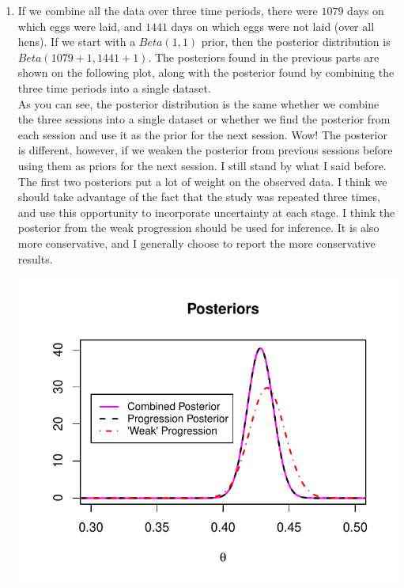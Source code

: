 \documentclass[11pt]{article}\usepackage[]{graphicx}\usepackage[]{color}
\newenvironment{knitrout}{}{} %
\begin{document}
\begin{doublespacing}
\begin{enumerate}
\begin{enumerate}
\begin{center}
\begin{knitrout}
\end{knitrout}
\end{center}

\item If we combine all the data over three time periods, there were $1079$ days on which eggs were laid, and $1441$ days on which eggs were not laid (over all hens). If we start with a $Beta(1, 1)$ prior, then the posterior distribution is $Beta(1079+1, 1441+1)$. The posteriors found in the previous parts are shown on the following plot, along with the posterior found by combining the three time periods into a single dataset. \\

As you can see, the posterior distribution is the same whether we combine the three sessions into a single dataset or whether we find the posterior from each session and use it as the prior for the next session. Wow! The posterior is different, however, if we weaken the posterior from previous sessions before using them as priors for the next session. I still stand by what I said before. The first two posteriors put a lot of weight on the observed data. I think we should take advantage of the fact that the study was repeated three times, and use this opportunity to incorporate uncertainty at each stage. I think the posterior from the weak progression should be used for inference. It is also more conservative, and I generally choose to report the more conservative results.

\begin{center}
\begin{knitrout}\footnotesize
{}\color{fgcolor}
\includegraphics[width=.5\linewidth]{figure/allposterior-1} 

\end{knitrout}
\end{center}


\end{enumerate}
\end{enumerate}
\end{doublespacing}
\end{document}
